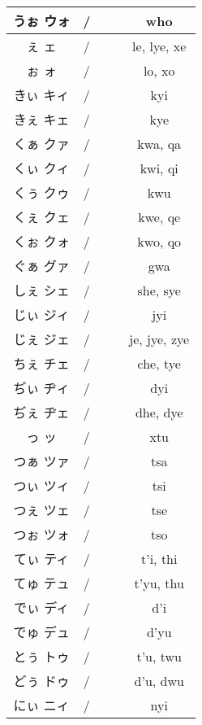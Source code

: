\documentclass{article}
\begin{document}
\begin{center}
\begin{japanese}
\begin{longtable}{|c|c c c|c|}
                うぉ ウォ & / &&& who \\ \hline
                ぇ ェ & / &&& le, lye, xe \\ \hline
                ぉ ォ & / &&& lo, xo \\ \hline
                きぃ キィ & / &&& kyi \\ \hline
                きぇ キェ & / &&& kye \\ \hline
                くぁ クァ & / &&& kwa, qa \\ \hline
                くぃ クィ & / &&& kwi, qi \\ \hline
                くぅ クゥ & / &&& kwu \\ \hline
                くぇ クェ & / &&& kwe, qe \\ \hline
                くぉ クォ & / &&& kwo, qo \\ \hline
                ぐぁ グァ & / &&& gwa \\ \hline
                しぇ シェ & / &&& she, sye \\ \hline
                じぃ ジィ & / &&& jyi \\ \hline
                じぇ ジェ & / &&& je, jye, zye \\ \hline
                ちぇ チェ & / &&& che, tye \\ \hline
                ぢぃ ヂィ & / &&& dyi \\ \hline
                ぢぇ ヂェ & / &&& dhe, dye \\ \hline
                っ ッ & / &&& xtu \\ \hline
                つぁ ツァ & / &&& tsa \\ \hline
                つぃ ツィ & / &&& tsi \\ \hline
                つぇ ツェ & / &&& tse \\ \hline
                つぉ ツォ & / &&& tso \\ \hline
                てぃ ティ & / &&& t'i, thi \\ \hline
                てゅ テュ & / &&& t'yu, thu \\ \hline
                でぃ ディ & / &&& d'i \\ \hline
                でゅ デュ & / &&& d'yu \\ \hline
                とぅ トゥ & / &&& t'u, twu \\ \hline
                どぅ ドゥ & / &&& d'u, dwu \\ \hline
                にぃ ニィ & / &&& nyi \\ \hline

\end{longtable}
\end{japanese}
\end{center}
\end{document}
